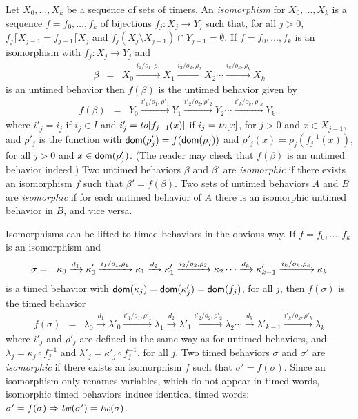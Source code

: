 Let $X_0,\ldots, X_k$ be a sequence of sets of timers.
An \emph{isomorphism} for $X_0,\ldots, X_k$ is a sequence $f = f_0 ,\ldots, f_k$ of bijections $f_j : X_j \rightarrow Y_j$ such that,
for all $j>0$, $f_j \lceil X_{j-1} = f_{j-1} \lceil X_j$ and $f_j (X_j \setminus X_{j-1}) \cap Y_{j-1} = \emptyset$.
If $f = f_0 ,\ldots, f_k$ is an isomorphism with $f_j : X_j \rightarrow Y_j$ and
\begin{eqnarray*}
\beta & = & X_0 \xrightarrow{i_1/o_1, \rho_1} X_1  \xrightarrow{i_2/o_2, \rho_2} X_2 \cdots \xrightarrow{i_k/o_k, \rho_k} X_{k}
\end{eqnarray*}
is an untimed behavior then $f(\beta)$ is the untimed behavior given by
\begin{eqnarray*}
f(\beta) & = & Y_0 \xrightarrow{i'_1/o_1, \rho'_1} Y_1  \xrightarrow{i'_2/o_2, \rho'_2} Y_2 \cdots \xrightarrow{i'_k/o_k, \rho'_k} Y_{k},
\end{eqnarray*}
where 
$i'_j = i_j$ if $i_j \in I$ and $i'_j = \mathit{to}[f_{j-1}(x)]$ if $i_j = \mathit{to}[x]$, for $j>0$ and $x \in X_{j-1}$, and
$\rho'_j$ is the function with ${\textsf{dom}}(\rho'_j) = f({\textsf{dom}}(\rho_j))$ and
$\rho'_j(x) = \rho_j ( f_j^{-1}(x))$, for all $j>0$ and $x\in{\textsf{dom}}(\rho'_j)$.
(The reader may check that $f(\beta)$ is an untimed behavior indeed.)
Two untimed behaviors $\beta$ and $\beta'$ are \emph{isomorphic} if there exists an isomorphism $f$ such that
$\beta' = f(\beta)$.
Two sets of untimed behaviors $A$ and $B$ are \emph{isomorphic} if for each untimed behavior of $A$ there is an isomorphic untimed behavior in $B$,
and vice versa.
\iflong

Isomorphisms can be lifted to timed behaviors in the obvious way. If $f = f_0 ,\ldots, f_k$ is an isomorphism and
\begin{eqnarray*}
\sigma & = & \kappa_0 \xrightarrow{d_1} \kappa'_0 \xrightarrow{i_1/o_1, \rho_1} \kappa_1 \xrightarrow{d_2} \kappa'_1 \xrightarrow{i_2/o_2, \rho_2} \kappa_2 \cdots
\xrightarrow{d_k} \kappa'_{k-1} \xrightarrow{i_k/o_k, \rho_k} \kappa_{k}
\end{eqnarray*}
is a timed behavior with ${\textsf{dom}}(\kappa_j) = {\textsf{dom}}(\kappa'_j) = {\textsf{dom}}(f_j)$, for all $j$, then $f(\sigma)$ is
the timed behavior
\begin{eqnarray*}
f(\sigma) & = & \lambda_0 \xrightarrow{d_1} \lambda'_0 \xrightarrow{i'_1/o_1, \rho'_1} \lambda_1 \xrightarrow{d_2} \lambda'_1 \xrightarrow{i'_2/o_2, \rho'_2} \lambda_2 \cdots
\xrightarrow{d_k} \lambda'_{k-1} \xrightarrow{i'_k/o_k, \rho'_k} \lambda_{k}
\end{eqnarray*}
where $i'_j$ and $\rho'_j$ are defined in the same way as for untimed behaviors, and
$\lambda_j = \kappa_j \circ f_j^{-1}$ and $\lambda'_j = \kappa'_j \circ f_j^{-1}$, for all $j$.
Two timed behaviors $\sigma$ and $\sigma'$ are \emph{isomorphic} if there exists an isomorphism $f$ such that
$\sigma' = f(\sigma)$.
Since an isomorphism only renames variables, which do not appear in timed words, 
isomorphic timed behaviors induce identical timed words: $\sigma' = f(\sigma) \Rightarrow \mathit{tw}(\sigma') = \mathit{tw}(\sigma)$.

